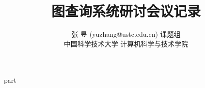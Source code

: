 \documentclass[a4paper,11pt,titlepage]{article}
\begin{document}
\title{图查询系统研讨会议记录}

\author{
\rm 张 昱 (yuzhang@ustc.edu.cn) 课题组\\
中国科学技术大学 计算机科学与技术学院
}

\maketitle
\tableofcontents
\setcounter{tocdepth}{3}
\newpage
{}

{part}
\newpage
\begin{footnotesize}
\nocite{*}

\end{footnotesize}
\end{document}
